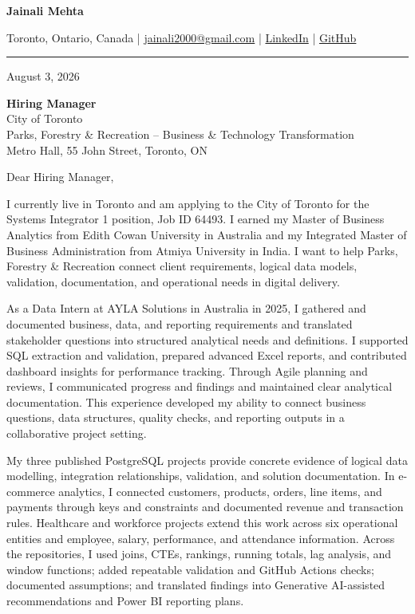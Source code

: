 \documentclass[letterpaper,10pt]{article}
\begin{document}
\begin{center}
  {\fontsize{17}{19}\selectfont\textbf{Jainali Mehta}}\par\vspace{2pt}
  \small Toronto, Ontario, Canada \;|\;
  \href{mailto:jainali2000@gmail.com}{jainali2000@gmail.com} \;|\;
  \href{https://www.linkedin.com/in/jainali-mehta}{LinkedIn} \;|\;
  \href{https://github.com/jainalimehta}{GitHub}
\end{center}
\vspace{-5pt}
\noindent\rule{\textwidth}{0.4pt}

August 3, 2026

\textbf{Hiring Manager}\\
City of Toronto\\
Parks, Forestry \& Recreation -- Business \& Technology Transformation\\
Metro Hall, 55 John Street, Toronto, ON

Dear Hiring Manager,

I currently live in Toronto and am applying to the City of Toronto for the Systems Integrator 1 position, Job ID 64493. I earned my Master of Business Analytics from Edith Cowan University in Australia and my Integrated Master of Business Administration from Atmiya University in India. I want to help Parks, Forestry \& Recreation connect client requirements, logical data models, validation, documentation, and operational needs in digital delivery.

As a Data Intern at AYLA Solutions in Australia in 2025, I gathered and documented business, data, and reporting requirements and translated stakeholder questions into structured analytical needs and definitions. I supported SQL extraction and validation, prepared advanced Excel reports, and contributed dashboard insights for performance tracking. Through Agile planning and reviews, I communicated progress and findings and maintained clear analytical documentation. This experience developed my ability to connect business questions, data structures, quality checks, and reporting outputs in a collaborative project setting.

My three published PostgreSQL projects provide concrete evidence of logical data modelling, integration relationships, validation, and solution documentation. In e-commerce analytics, I connected customers, products, orders, line items, and payments through keys and constraints and documented revenue and transaction rules. Healthcare and workforce projects extend this work across six operational entities and employee, salary, performance, and attendance information. Across the repositories, I used joins, CTEs, rankings, running totals, lag analysis, and window functions; added repeatable validation and GitHub Actions checks; documented assumptions; and translated findings into Generative AI-assisted recommendations and Power BI reporting plans.
\end{document}
